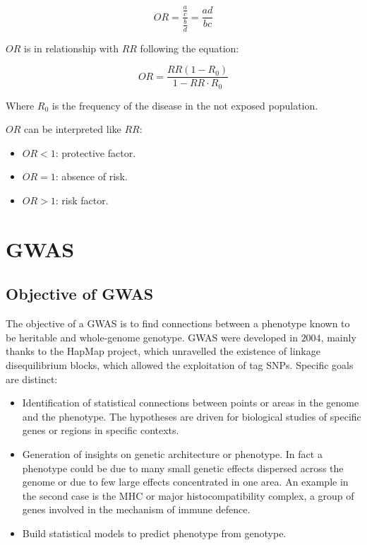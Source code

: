 		$$OR = \frac{\frac{a}{c}}{\frac{b}{d}} = \frac{ad}{bc}$$

		$OR$ is in relationship with $RR$ following the equation:

		$$OR = \frac{RR(1-R_0)}{1-RR\cdot R_0}$$

		Where $R_0$ is the frequency of the disease in the not exposed population.

		$OR$ can be interpreted like $RR$:

		\begin{multicols}{3}
			\begin{itemize}
				\item $OR <1$: protective factor.
				\item $OR = 1$: absence of risk.
				\item $OR > 1$: risk factor.
			\end{itemize}
		\end{multicols}

\section{GWAS}

	\subsection{Objective of GWAS}
	The objective of a GWAS is to find connections between a phenotype known to be heritable and whole-genome genotype.
	GWAS were developed in $2004$, mainly thanks to the HapMap project, which unravelled the existence of linkage disequilibrium blocks, which allowed the exploitation of tag SNPs.
	Specific goals are distinct:

	\begin{multicols}{2}
		\begin{itemize}
			\item Identification of statistical connections between points or areas in the genome and the phenotype.
				The hypotheses are driven for biological studies of specific genes or regions in specific contexts.
			\item Generation of insights on genetic architecture or phenotype.
				In fact a phenotype could be due to many small genetic effects dispersed across the genome or due to few large effects concentrated in one area.
				An example in the second case is the MHC or major histocompatibility complex, a group of genes involved in the mechanism of immune defence.
			\item Build statistical models to predict phenotype from genotype.
		\end{itemize}
	\end{multicols}

